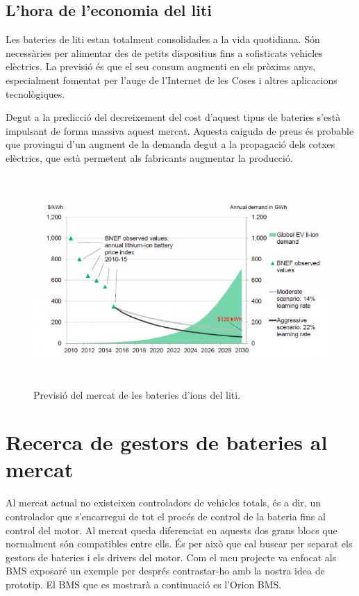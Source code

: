 \subsection{L'hora de l'economia del liti}
Les bateries de liti estan totalment consolidades a la vida quotidiana. Són necessàries per alimentar des de petits dispositius fins a sofisticats vehicles elèctrics. La previsió és que el seu consum augmenti en els pròxims anys, especialment fomentat per l'auge de l'Internet de les Coses i altres aplicacions tecnològiques.

Degut a la predicció del decreixement del cost d'aquest tipus de bateries s'està impulsant de forma massiva aquest mercat. Aquesta caiguda de preus és probable que provingui d'un augment de la demanda degut a la propagació dels cotxes elèctrics, que està permetent als fabricants augmentar la producció. 
\begin{figure}[H]
		\centering
    	\includegraphics[width=13cm, height=8cm]{Marcteoric/mercatbaterialitioion.png}
     	\caption{Previsió del mercat de les bateries d'ions del liti.} 
\end{figure}

\section{Recerca de gestors de bateries al mercat}
Al mercat actual no existeixen controladors de vehicles totals, és a dir, un controlador que s'encarregui de tot el procés de control de la bateria fins al control del motor. Al mercat queda diferenciat en aquests dos grans blocs que normalment són compatibles entre ells. És per això que cal buscar per separat els gestors de bateries i els drivers del motor. Com el meu projecte va enfocat als BMS exposaré un exemple per després contrastar-ho amb la nostra idea de prototip. El BMS que es mostrarà a continuació es l'Orion BMS.

